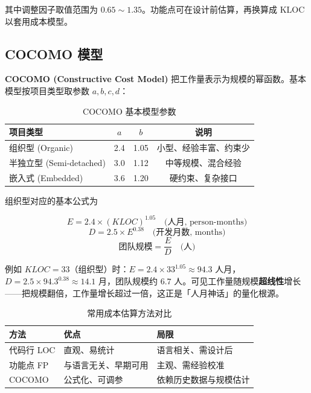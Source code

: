 其中调整因子取值范围为 $0.65\sim1.35$。功能点可在设计前估算，再换算成 KLOC 以套用成本模型。

\subsection{COCOMO 模型}

\textbf{COCOMO (Constructive Cost Model)} 把工作量表示为规模的幂函数。基本模型按项目类型取参数 $a,b,c,d$：

\begin{table}[H]
\centering
\caption{COCOMO 基本模型参数}
\begin{tabulary}{\textwidth}{LCCC}
\toprule
项目类型 & $a$ & $b$ & 说明 \\
\midrule
组织型 (Organic) & 2.4 & 1.05 & 小型、经验丰富、约束少 \\
半独立型 (Semi-detached) & 3.0 & 1.12 & 中等规模、混合经验 \\
嵌入式 (Embedded) & 3.6 & 1.20 & 硬约束、复杂接口 \\
\bottomrule
\end{tabulary}
\end{table}

\noindent 组织型对应的基本公式为

\begin{equation}
    E = 2.4 \times (KLOC)^{1.05} \quad \text{(人月, person-months)}
\end{equation}
\begin{equation}
    D = 2.5 \times E^{0.38} \quad \text{(开发月数, months)}
\end{equation}
\begin{equation}
    \text{团队规模} = \frac{E}{D} \quad \text{(人)}
\end{equation}

\noindent 例如 $KLOC=33$（组织型）时：$E=2.4\times33^{1.05}\approx94.3$ 人月，$D=2.5\times94.3^{0.38}\approx14.1$ 月，团队规模约 $6.7$ 人。可见工作量随规模\textbf{超线性}增长——把规模翻倍，工作量增长超过一倍，这正是「人月神话」的量化根源。

\begin{table}[H]
\centering
\caption{常用成本估算方法对比}
\begin{tabulary}{\textwidth}{LLL}
\toprule
方法 & 优点 & 局限 \\
\midrule
代码行 LOC & 直观、易统计 & 语言相关、需设计后 \\
功能点 FP & 与语言无关、早期可用 & 主观、需经验校准 \\
COCOMO & 公式化、可调参 & 依赖历史数据与规模估计 \\
\bottomrule
\end{tabulary}
\end{table}

